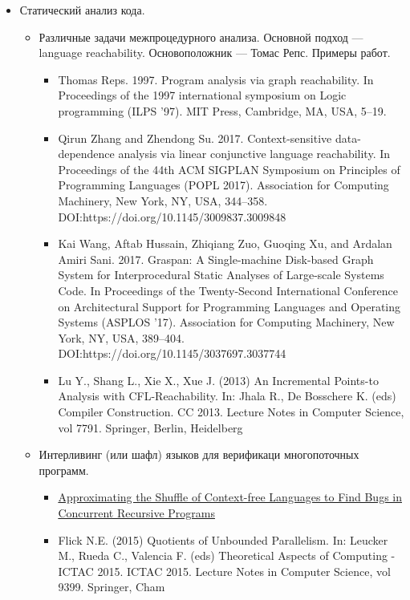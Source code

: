 \begin{itemize}
  \item Статический анализ кода.
  \begin{itemize}
    \item Различные задачи межпроцедурного анализа. Основной подход --- language reachability. Основоположник --- Томас Репс. Примеры работ.
    \begin{itemize}
      \item Thomas Reps. 1997. Program analysis via graph reachability. In Proceedings of the 1997 international symposium on Logic programming (ILPS ’97). MIT Press, Cambridge, MA, USA, 5–19.
      \item Qirun Zhang and Zhendong Su. 2017. Context-sensitive data-dependence analysis via linear conjunctive language reachability. In Proceedings of the 44th ACM SIGPLAN Symposium on Principles of Programming Languages (POPL 2017). Association for Computing Machinery, New York, NY, USA, 344–358. DOI:https://doi.org/10.1145/3009837.3009848
      \item Kai Wang, Aftab Hussain, Zhiqiang Zuo, Guoqing Xu, and Ardalan Amiri Sani. 2017. Graspan: A Single-machine Disk-based Graph System for Interprocedural Static Analyses of Large-scale Systems Code. In Proceedings of the Twenty-Second International Conference on Architectural Support for Programming Languages and Operating Systems (ASPLOS ’17). Association for Computing Machinery, New York, NY, USA, 389–404. DOI:https://doi.org/10.1145/3037697.3037744
      \item Lu Y., Shang L., Xie X., Xue J. (2013) An Incremental Points-to Analysis with CFL-Reachability. In: Jhala R., De Bosschere K. (eds) Compiler Construction. CC 2013. Lecture Notes in Computer Science, vol 7791. Springer, Berlin, Heidelberg
    \end{itemize}
    \item Интерливинг (или шафл) языков для верификаци многопоточных программ.
    \begin{itemize}
      \item \href{http://uu.diva-portal.org/smash/get/diva2:442518/FULLTEXT01.pdf}{Approximating the Shuffle of Context-free Languages to Find Bugs in Concurrent Recursive Programs}
      \item Flick N.E. (2015) Quotients of Unbounded Parallelism. In: Leucker M., Rueda C., Valencia F. (eds) Theoretical Aspects of Computing - ICTAC 2015. ICTAC 2015. Lecture Notes in Computer Science, vol 9399. Springer, Cham
    \end{itemize}


\end{itemize}
\end{itemize}
